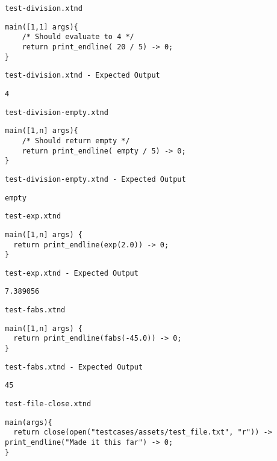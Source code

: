 \medskip \noindent \texttt{test-division.xtnd}


\begin{lstlisting}
main([1,1] args){
	/* Should evaluate to 4 */
	return print_endline( 20 / 5) -> 0;
}
\end{lstlisting}


\medskip \noindent \texttt{test-division.xtnd - Expected Output}


\begin{lstlisting}
4
\end{lstlisting}


\medskip \noindent \texttt{test-division-empty.xtnd}


\begin{lstlisting}
main([1,n] args){
	/* Should return empty */
	return print_endline( empty / 5) -> 0;
}
\end{lstlisting}


\medskip \noindent \texttt{test-division-empty.xtnd - Expected Output}


\begin{lstlisting}
empty
\end{lstlisting}


\medskip \noindent \texttt{test-exp.xtnd}


\begin{lstlisting}
main([1,n] args) {
  return print_endline(exp(2.0)) -> 0;
}
\end{lstlisting}


\medskip \noindent \texttt{test-exp.xtnd - Expected Output}


\begin{lstlisting}
7.389056
\end{lstlisting}


\medskip \noindent \texttt{test-fabs.xtnd}


\begin{lstlisting}
main([1,n] args) {
  return print_endline(fabs(-45.0)) -> 0;
}
\end{lstlisting}


\medskip \noindent \texttt{test-fabs.xtnd - Expected Output}


\begin{lstlisting}
45
\end{lstlisting}


\medskip \noindent \texttt{test-file-close.xtnd}


\begin{lstlisting}
main(args){
  return close(open("testcases/assets/test_file.txt", "r")) -> print_endline("Made it this far") -> 0;
}
\end{lstlisting}


